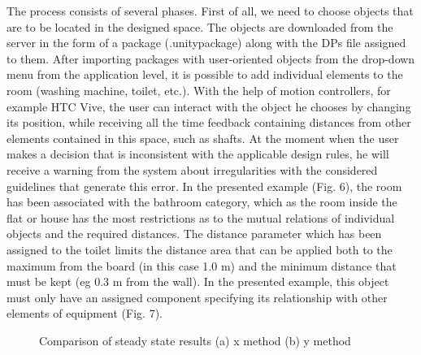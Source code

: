 \documentclass[runningheads]{llncs}
\begin{document}
The process consists of several phases. First of all, we need to choose objects that are to be located in the designed space. The objects are downloaded from the server in the form of a package (.unitypackage) along with the DPs file assigned to them. After importing packages with user-oriented objects from the drop-down menu from the application level, it is possible to add individual elements to the room (washing machine, toilet, etc.). With the help of motion controllers, for example HTC Vive, the user can interact with the object he chooses by changing its position, while receiving all the time feedback containing distances from other elements contained in this space, such as shafts.
At the moment when the user makes a decision that is inconsistent with the applicable design rules, he will receive a warning from the system about irregularities with the considered guidelines that generate this error.
In the presented example (Fig. 6), the room has been associated with the bathroom category, which as the room inside the flat or house has the most restrictions as to the mutual relations of individual objects and the required distances. The distance parameter which has been assigned to the toilet limits the distance area that can be applied both to the maximum from the board (in this case 1.0 m) and the minimum distance that must be kept (eg 0.3 m from the wall). In the presented example, this object must only have an assigned component specifying its relationship with other elements of equipment (Fig. 7).

\begin{figure}[H]
     \centering
     \hspace{0.5cm}
     \caption{Comparison of steady state results (a) x method (b) y method}
     \label{fig7}
\end{figure}
\end{document}
